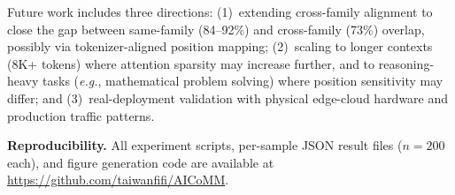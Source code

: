 \documentclass[journal]{IEEEtran}
\newcommand{\eg}{\textit{e.g.}\xspace}
\begin{document}
Future work includes three directions: (1)~extending cross-family alignment to close the gap between same-family (84--92\%) and cross-family (73\%) overlap, possibly via tokenizer-aligned position mapping; (2)~scaling to longer contexts (8K+ tokens) where attention sparsity may increase further, and to reasoning-heavy tasks (\eg, mathematical problem solving) where position sensitivity may differ; and (3)~real-deployment validation with physical edge-cloud hardware and production traffic patterns.

\smallskip
\noindent\textbf{Reproducibility.}
All experiment scripts, per-sample JSON result files ($n = 200$ each), and figure generation code are available at \url{https://github.com/taiwanfifi/AICoMM}.


\end{document}
